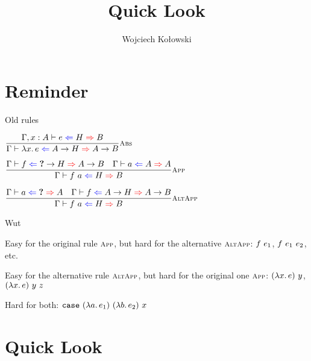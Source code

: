 \documentclass{beamer}
\title{Quick Look}
\author{Wojciech Kołowski}
\date{}
\begin{document}
\frame{\titlepage}

\section{Reminder}

\begin{frame}{Old rules}

\begin{center}
  $\infrule[Abs]{\fullhinting{\extend{\Gamma}{x}{A}}{e}{H}{B}}{\hinting{\fun{x}{e}}{\Fun{A}{H}}{\Fun{A}{B}}}$

  \vspace{2em}

  $\infrule[App]{\hinting{f}{\Fun{\Hole}{H}}{\Fun{A}{B}} \quad \hinting{a}{A}{A}}{\hinting{\app{f}{a}}{H}{B}}$

  \vspace{2em}

  $\infrule[AltApp]{\hinting{a}{\Hole}{A} \quad \hinting{f}{\Fun{A}{H}}{\Fun{A}{B}}}{\hinting{\app{f}{a}}{H}{B}}$
\end{center}

\end{frame}

\newcommand{\funcase}{\texttt{case}}

\begin{frame}{Wut}

Easy for the original rule $\textsc{\footnotesize{App}}$, but hard for the alternative $\textsc{\footnotesize{AltApp}}$: $f\ e_1$, $f\ e_1\ e_2$, etc.

\vspace{2em}

Easy for the alternative rule $\textsc{\footnotesize{AltApp}}$, but hard for the original one $\textsc{\footnotesize{App}}$: $(\lambda x.\, e)\ y$, $(\lambda x.\, e)\ y\ z$

\vspace{2em}

Hard for both: $\app{\app{\app{\app{\funcase}{(\fun{a}{e_1})}}{(\fun{b}{e_2})}}{x}}{}$
\end{frame}

\section{Quick Look}

\newcommand{\fullquicklookinfer}[3]{#1 \vdash #2 \mathcolor{green}{\Rightarrow} #3}
\newcommand{\quicklookinfer}[2]{\fullquicklookinfer{\Gamma}{#1}{#2}}
\end{document}
